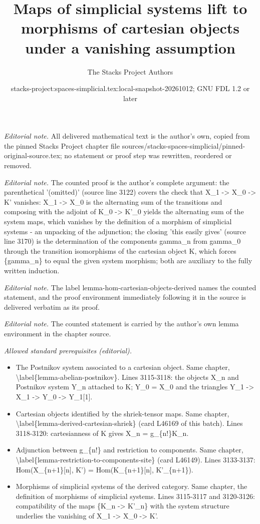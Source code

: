\documentclass{stacks-project}
\title{Maps of simplicial systems lift to morphisms of cartesian objects under a vanishing assumption}
\author{The Stacks Project Authors}
\date{stacks-project:spaces-simplicial.tex:local-snapshot-20261012; GNU FDL 1.2 or later}
\theoremstyle{plain}
\theoremstyle{definition}
\theoremstyle{remark}
\numberwithin{equation}{subsection}
\begin{document}
\maketitle
\noindent\textit{Editorial note.} All delivered mathematical text is the author's own, copied from the pinned Stacks Project chapter file sources/stacks-spaces-simplicial/pinned-original-source.tex; no statement or proof step was rewritten, reordered or removed.\par\medskip
\noindent\textit{Editorial note.} The counted proof is the author's complete argument: the parenthetical '(omitted)' (source line 3122) covers the check that X\_1 -> X\_0 -> K' vanishes: X\_1 -> X\_0 is the alternating sum of the transitions and composing with the adjoint of K\_0 -> K'\_0 yields the alternating sum of the system maps, which vanishes by the definition of a morphism of simplicial systems - an unpacking of the adjunction; the closing 'this easily gives' (source line 3170) is the determination of the components gamma\_n from gamma\_0 through the transition isomorphisms of the cartesian object K, which forces \{gamma\_n\} to equal the given system morphism; both are auxiliary to the fully written induction.\par\medskip
\noindent\textit{Editorial note.} The label lemma-hom-cartesian-objects-derived names the counted statement, and the proof environment immediately following it in the source is delivered verbatim as its proof.\par\medskip
\noindent\textit{Editorial note.} The counted statement is carried by the author's own lemma environment in the chapter source.\par\medskip
\noindent\textit{Allowed standard prerequisites (editorial).}\begin{itemize}
\item The Postnikov system associated to a cartesian object. Same chapter, \textbackslash{}label\{lemma-abelian-postnikov\}. Lines 3115-3118: the objects X\_n and Postnikov system Y\_n attached to K; Y\_0 = X\_0 and the triangles Y\_1 -> X\_1 -> Y\_0 -> Y\_1[1].
\item Cartesian objects identified by the shriek-tensor maps. Same chapter, \textbackslash{}label\{lemma-derived-cartesian-shriek\} (card L46169 of this batch). Lines 3118-3120: cartesianness of K gives X\_n = g\_\{n!\}K\_n.
\item Adjunction between g\_\{n!\} and restriction to components. Same chapter, \textbackslash{}label\{lemma-restriction-to-components-site\} (card L46149). Lines 3133-3137: Hom(X\_\{n+1\}[n], K') = Hom(K\_\{n+1\}[n], K'\_\{n+1\}).
\item Morphisms of simplicial systems of the derived category. Same chapter, the definition of morphisms of simplicial systems. Lines 3115-3117 and 3120-3126: compatibility of the maps \{K\_n -> K'\_n\} with the system structure underlies the vanishing of X\_1 -> X\_0 -> K'.
\end{itemize}\medskip
\end{document}
